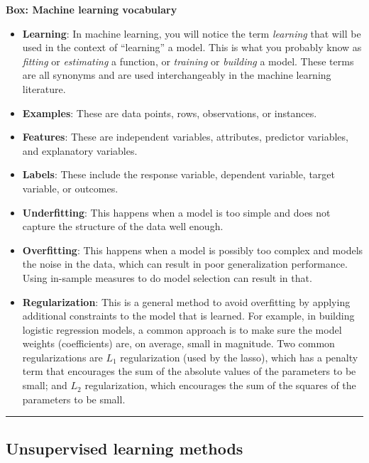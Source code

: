 \documentclass[]{krantz}
\begin{document}
\textbf{Box: Machine learning vocabulary}

\begin{itemize}
\item
  \textbf{Learning}: In machine learning, you will notice the term
  \emph{learning} that will be used in the context of ``learning'' a
  model. This is what you probably know as \emph{fitting} or
  \emph{estimating} a function, or \emph{training} or \emph{building} a
  model. These terms are all synonyms and are used interchangeably in
  the machine learning literature.
\item
  \textbf{Examples}: These are data points, rows, observations, or
  instances.
\item
  \textbf{Features}: These are independent variables, attributes,
  predictor variables, and explanatory variables.
\item
  \textbf{Labels}: These include the response variable, dependent
  variable, target variable, or outcomes.
\item
  \textbf{Underfitting}: This happens when a model is too simple and
  does not capture the structure of the data well enough.
\item
  \textbf{Overfitting}: This happens when a model is possibly too
  complex and models the noise in the data, which can result in poor
  generalization performance. Using in-sample measures to do model
  selection can result in that.
\item
  \textbf{Regularization}: This is a general method to avoid overfitting
  by applying additional constraints to the model that is learned. For
  example, in building logistic regression models, a common approach is
  to make sure the model weights (coefficients) are, on average, small
  in magnitude. Two common regularizations are \(L_1\) regularization
  (used by the lasso), which has a penalty term that encourages the sum
  of the absolute values of the parameters to be small; and \(L_2\)
  regularization, which encourages the sum of the squares of the
  parameters to be small.
\end{itemize}

\begin{center}\rule{0.5\linewidth}{\linethickness}\end{center}

\subsection{Unsupervised learning
methods}\label{unsupervised-learning-methods}
\end{document}
